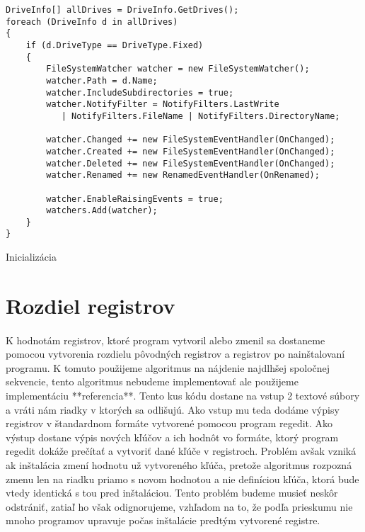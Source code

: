 \begin{listing}
\begin{verbatim}
DriveInfo[] allDrives = DriveInfo.GetDrives();
foreach (DriveInfo d in allDrives)
{
    if (d.DriveType == DriveType.Fixed) 
    { 
        FileSystemWatcher watcher = new FileSystemWatcher();
        watcher.Path = d.Name;
        watcher.IncludeSubdirectories = true;
        watcher.NotifyFilter = NotifyFilters.LastWrite
           | NotifyFilters.FileName | NotifyFilters.DirectoryName;

        watcher.Changed += new FileSystemEventHandler(OnChanged);
        watcher.Created += new FileSystemEventHandler(OnChanged);
        watcher.Deleted += new FileSystemEventHandler(OnChanged);
        watcher.Renamed += new RenamedEventHandler(OnRenamed);

        watcher.EnableRaisingEvents = true;
        watchers.Add(watcher);
    }
}         
\end{verbatim}
\caption{Inicializácia}
\label{lst:init}
\end{listing}

\section{Rozdiel registrov}
\paragraph{}
K hodnotám registrov, ktoré program vytvoril alebo zmenil sa dostaneme pomocou vytvorenia rozdielu pôvodných registrov a registrov po nainštalovaní programu. K tomuto použijeme algoritmus na nájdenie najdlhšej spoločnej sekvencie, tento algoritmus nebudeme implementovať ale použijeme implementáciu **referencia**. Tento kus kódu dostane na vstup 2 textové súbory a vráti nám riadky v ktorých sa odlišujú. Ako vstup mu teda dodáme výpisy registrov v štandardnom formáte vytvorené pomocou program regedit. Ako výstup dostane výpis nových kľúčov a ich hodnôt vo formáte, ktorý program regedit dokáže prečítať a vytvoriť dané kľúče v registroch. Problém avšak vzniká ak inštalácia zmení hodnotu už vytvoreného kľúča, pretože algoritmus rozpozná zmenu len na riadku priamo s novom hodnotou a nie definíciou kľúča, ktorá bude vtedy identická s tou pred inštaláciou. Tento problém budeme musieť neskôr odstrániť, zatiaľ ho však odignorujeme, vzhľadom na to, že podľa prieskumu nie mnoho programov upravuje počas inštalácie predtým vytvorené registre.

